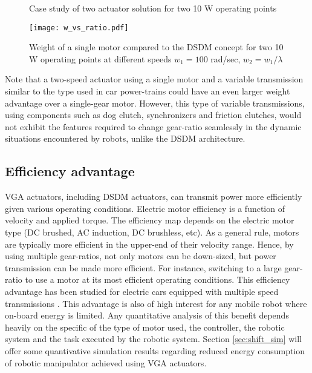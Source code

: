 \begin{figure}[H]
        \centering
        \caption{Case study of two actuator solution for two 10 W operating points }\label{fig:solutions}
\end{figure}

\begin{figure}[H]
	\centering
		\texttt{[image: w\_vs\_ratio.pdf]}
	\caption[DSDM weight analysis]{Weight of a single motor compared to the DSDM concept for two 10 W operating points at different speeds $w_1=100$ rad/sec, $w_2 = w_1 / \lambda$}
	\label{fig:1vs2}
\end{figure}

Note that a two-speed actuator using a single motor and a variable transmission similar to the type used in car power-trains could have an even larger weight advantage over a single-gear motor. However, this type of variable transmissions, using components such as dog clutch, synchronizers and friction clutches, would not exhibit the features required to change gear-ratio seamlessly in the dynamic situations encountered by robots, unlike the DSDM architecture.

\subsection{Efficiency advantage}
\label{sec:EffAdvantage}

VGA actuators, including DSDM actuators, can transmit power more efficiently given various operating conditions. Electric motor efficiency is a function of velocity and applied torque. The efficiency map depends on the electric motor type (DC brushed, AC induction, DC brushless, etc). As a general rule, motors are typically more efficient in the upper-end of their velocity range. Hence, by using multiple gear-ratios, not only motors can be down-sized, but power transmission can be made more efficient. For instance, switching to a large gear-ratio to use a motor at its most efficient operating conditions. This efficiency advantage has been studied for electric cars equipped with multiple speed transmissions \cite{ren_effect_2009} \cite{holdstock_energy_2012} \cite{zhang_three-speed_2013} \cite{mckeegan_antonovs_2011}. This advantage is also of high interest for any mobile robot where on-board energy is limited. Any quantitative analysis of this benefit depends heavily on the specific of the type of motor used, the controller, the robotic system and the task executed by the robotic system. Section \ref{sec:shift_sim} will offer some quantivative simulation results regarding reduced energy consumption of robotic manipulator achieved using VGA actuators.

